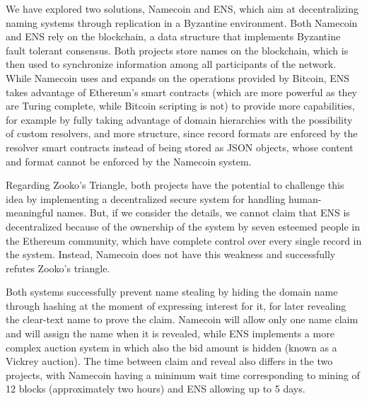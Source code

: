 \documentclass[mscthesis]{usiinfthesis}
\begin{document}
We have explored two solutions, Namecoin and ENS, which aim at decentralizing naming systems through replication in a Byzantine environment.
Both Namecoin and ENS rely on the blockchain, a data structure that implements Byzantine fault tolerant consensus. Both projects store names on the blockchain, which is then used to synchronize information among all participants of the network. While Namecoin uses and expands on the operations provided by Bitcoin, ENS takes advantage of Ethereum's smart contracts (which are more powerful as they are Turing complete, while Bitcoin scripting is not) to provide more capabilities, for example by fully taking advantage of domain hierarchies with the possibility of custom resolvers, and more structure, since record formats are enforced by the resolver smart contracts instead of being stored as JSON objects, whose content and format cannot be enforced by the Namecoin system. %

Regarding Zooko's Triangle, both projects have the potential to challenge this idea by implementing a decentralized secure system for handling human-meaningful names. But, if we consider the details, we cannot claim that ENS is decentralized because of the ownership of the system by seven esteemed people in the Ethereum community, which have complete control over every single record in the system. Instead, Namecoin does not have this weakness and successfully refutes Zooko's triangle.

Both systems successfully prevent name stealing by hiding the domain name through hashing at the moment of expressing interest for it, for later revealing the clear-text name to prove the claim. Namecoin will allow only one name claim and will assign the name when it is revealed, while ENS implements a more complex auction system in which also the bid amount is hidden (known as a Vickrey auction). The time between claim and reveal also differs in the two projects, with Namecoin having a minimum wait time corresponding to mining of 12 blocks (approximately two hours) and ENS allowing up to 5 days.
\end{document}
